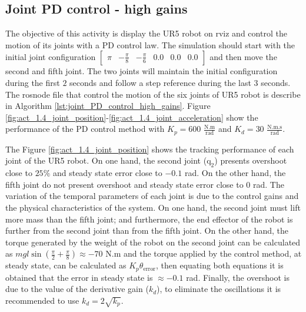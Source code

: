 \subsection{Joint PD control - high gains}
The objective of this activity is display the UR5 robot on rviz and control the motion of its joints with a PD control law. The simulation should start with the initial joint configuration $\begin{bmatrix} \pi & -\frac{\pi}{8} & -\frac{\pi}{6} & 0.0 & 0.0 & 0.0 \end{bmatrix}$ and then move the second and fifth joint. The two joints will maintain the initial configuration during the first $2$ seconds and follow a step reference during the last $3$ seconds. The rosnode file that control the motion of the six joints of UR5 robot is describe in Algorithm \ref{lst:joint_PD_control_high_gains}. Figure \ref{fig:act_1.4_joint_position}-\ref{fig:act_1.4_joint_acceleration} show the performance of the PD control method with $K_p=600$ $\mathrm{\frac{N.m}{rad}}$ and $K_d=30$ $\mathrm{\frac{N.m.s}{rad}}$. 

The Figure \ref{fig:act_1.4_joint_position} shows the tracking performance of each joint of the UR5 robot. On one hand, the second joint ($\mathrm{q}_2$) presents overshoot close to $25\%$ and steady state error close to $-0.1$ rad. On the other hand, the fifth joint do not present overshoot and steady state error close to $0$ rad. The variation of the temporal parameters of each joint is due to the control gains and the physical characteristics of the system. On one hand, the second joint must lift more mass than the fifth joint; and furthermore, the end effector of the robot is further from the second joint than from the fifth joint. On the other hand, the torque generated by the weight of the robot on the second joint can be calculated as $m g l \sin({\frac{\pi}{2} + \frac{\pi}{8}}) \approx -70$ N.m and the torque applied by the control method, at steady state, can be calculated as $K_p \theta_{\mathrm{error}}$, then equating both equations it is obtained that the error in steady state is $\approx -0.1$ rad. Finally, the overshoot is due to the value of the derivative gain ($k_d$), to eliminate the oscillations it is recommended to use $k_d = 2 \sqrt{k_p}$. 



